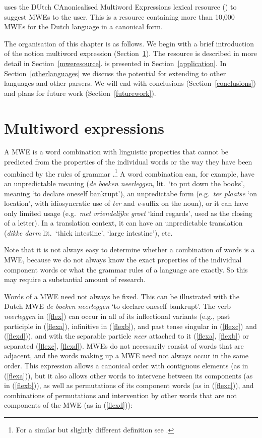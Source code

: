 \documentclass[output=paper,colorlinks,citecolor=brown]{langscibook}
\begin{document}
{\mwefinder} uses the DUtch CAnonicalised Multiword Expressions lexical resource ({\DUCAME}) to suggest MWEs to the user.
This  is a resource containing more than 10,000 MWEs for the Dutch language in a canonical form.


The organisation of this chapter is as follows. We begin with a brief introduction of the notion multiword expression (Section~\ref{mwe}).
The {\DUCAME} resource is described in more detail in Section~\ref{mweresource}. {\mwefinder}  is presented in Section~\ref{application}.  In Section~\ref{otherlanguages} we discuss the potential for extending  {\mwefinder} to other languages and other parsers. We will end with conclusions (Section~\ref{conclusions}) and plans for future work (Section~\ref{futurework}).

\section{Multiword expressions}
\label{mwe}
A MWE is a word combination  with linguistic properties
that cannot be predicted from the properties of the individual words or the
way they have been combined by the rules of grammar \citep{Odijk:2013-382996}.\footnote{For a similar but slightly different definition see \citet{Sag:Baldwin:2002}.}
A word combination can, for example, have an unpredictable
meaning (\textit{de boeken neerleggen}, lit.\ ‘to put down the books’, meaning ‘to declare
oneself bankrupt’), an unpredictabe form (e.g.\ \textit{ter plaatse} `on location', with idiosyncratic use of \textit{ter} and \textit{e}-suffix on the noun), or it can have only limited usage (e.g.\ \textit{met vriendelijke groet} ‘kind
regards’, used as the closing of a letter). In a translation context, it can have an unpredictable translation (\textit{dikke darm} lit.\ ‘thick intestine’, ‘large intestine’), etc.

Note that it is not always easy to determine whether a combination of words is a MWE, because we do not always know the exact properties of the individual component words or what the grammar rules of a language are exactly. So this may require a substantial amount of research.


Words of a MWE need not always be fixed. This can be illustrated
with the Dutch MWE \textit{de boeken neerleggen} ‘to declare oneself bankrupt’. The verb \textit{neerleggen} in (\ref{flex}) can occur in all of its inflectional variants (e.g., past participle in (\ref{flexa}), infinitive in (\ref{flexb}), and past tense singular in (\ref{flexc}) and (\ref{flexd})), and with the separable particle \textit{neer} attached to it (\ref{flexa}, \ref{flexb}) or separated (\ref{flexc}, \ref{flexd}).
MWEs do not necessarily consist of words that are adjacent, and the words making up a MWE need not always occur in the same order. This expression allows a canonical order with contiguous elements (as in (\ref{flexa})), but it also allows other words to intervene between its components (as in (\ref{flexb})), as well as permutations of its component words (as in (\ref{flexc})), and combinations of permutations and intervention by other words that are not components of the MWE (as in (\ref{flexd})):
\end{document}
